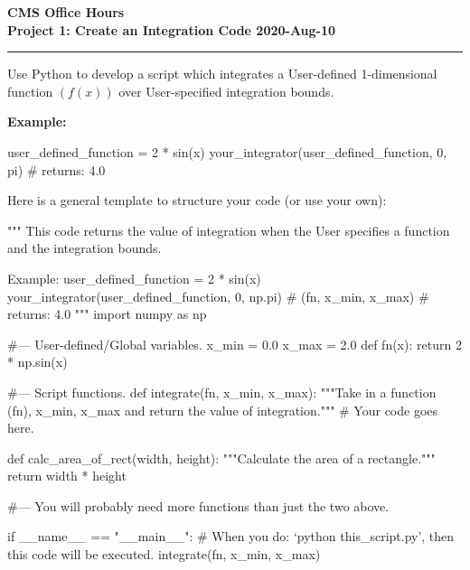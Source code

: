 \documentclass[11pt]{article}
\begin{document}
\Large
\noindent\textbf{CMS Office Hours} \\
\noindent\textbf{Project 1: Create an Integration Code \hfill 2020-Aug-10}
\medskip\hrule
\vspace{5mm}

Use Python to develop a script which integrates a User-defined 1-dimensional function 
$\left( f(x) \right)$
over User-specified integration bounds. 

\textbf{Example:}
\begin{python}
user_defined_function = 2 * sin(x)
your_integrator(user_defined_function, 0, pi)
# returns: 4.0
\end{python}

Here is a general template to structure your code (or use your own):

\begin{python}
"""
This code returns the value of integration when the User 
specifies a function and the integration bounds. 

Example:
    user_defined_function = 2 * sin(x)
    your_integrator(user_defined_function, 0, np.pi)  # (fn, x_min, x_max)
    # returns: 4.0
"""
import numpy as np

#--- User-defined/Global variables. 
x_min = 0.0
x_max = 2.0
def fn(x):
    return 2 * np.sin(x)

#--- Script functions.
def integrate(fn, x_min, x_max):
    """Take in a function (fn), x_min, x_max and return the value of integration."""
    # Your code goes here.

def calc_area_of_rect(width, height):
    """Calculate the area of a rectangle."""
    return width * height

#--- You will probably need more functions than just the two above.       

if __name__ == "__main__":
    # When you do: `python this_script.py', then this code will be executed.
    integrate(fn, x_min, x_max)
\end{python}
\end{document}
